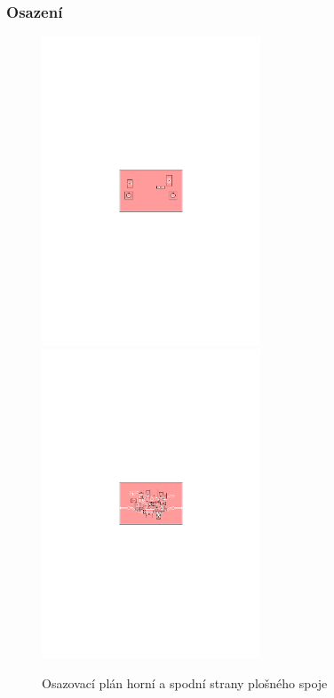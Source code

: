\documentclass[12pt,a4paper,oneside]{article}
\begin{document}
\subsubsection{Osazení}



\newpage


\begin{figure} [h!tbp]
  \centering
  \includegraphics[trim = 7.3cm 12.7cm 7.3cm 12.7cm, clip, width=6.5cm]{../../CAM_DOC/O1.pdf}
  \includegraphics[trim = 7.3cm 12.7cm 7.3cm 12.7cm, clip, width=6.5cm]{../../CAM_DOC/O2.pdf}
  \caption{Osazovací plán horní a spodní strany plošného spoje}
  \label{fig:osazovaci_plan}
\end{figure}
\end{document}
